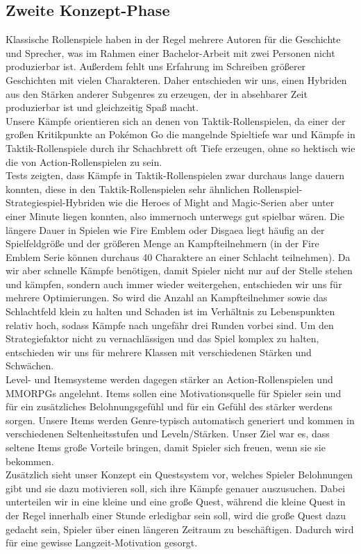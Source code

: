 \documentclass[extern,palatino]{cgBA}
\begin{document}
\subsection{Zweite Konzept-Phase}
Klassische Rollenspiele haben in der Regel mehrere Autoren für die Geschichte und Sprecher, was im Rahmen einer Bachelor-Arbeit mit zwei Personen nicht produzierbar ist. Außerdem fehlt uns Erfahrung im Schreiben größerer Geschichten mit vielen Charakteren. Daher entschieden wir uns, einen Hybriden aus den Stärken anderer Subgenres zu erzeugen, der in absehbarer Zeit produzierbar ist und gleichzeitig Spaß macht. 
\\Unsere Kämpfe orientieren sich an denen von Taktik-Rollenspielen, da einer der großen Kritikpunkte an Pokémon Go die mangelnde Spieltiefe war und Kämpfe in Taktik-Rollenspiele durch ihr Schachbrett oft Tiefe erzeugen, ohne so hektisch wie die von Action-Rollenspielen zu sein. \\Tests zeigten, dass Kämpfe in Taktik-Rollenspielen zwar durchaus lange dauern konnten, diese in den Taktik-Rollenspielen sehr ähnlichen Rollenspiel-Strategiespiel-Hybriden wie die Heroes of Might and Magic-Serien aber unter einer Minute liegen konnten, also immernoch unterwegs gut spielbar wären. Die längere Dauer in Spielen wie Fire Emblem oder Disgaea liegt häufig an der Spielfeldgröße und der größeren Menge an Kampfteilnehmern (in der Fire Emblem Serie können durchaus 40 Charaktere an einer Schlacht teilnehmen). Da wir aber schnelle Kämpfe benötigen, damit Spieler nicht nur auf der Stelle stehen und kämpfen,  sondern auch immer wieder weitergehen, entschieden wir uns für mehrere Optimierungen. So wird die Anzahl an Kampfteilnehmer sowie das Schlachtfeld klein zu halten und Schaden ist im Verhältnis zu Lebenspunkten relativ hoch, sodass Kämpfe nach ungefähr drei Runden vorbei sind. Um den Strategiefaktor nicht zu vernachlässigen und das Spiel komplex zu halten, entschieden wir uns für mehrere Klassen mit verschiedenen Stärken und Schwächen.
\\Level- und Itemsysteme werden dagegen stärker an Action-Rollenspielen und MMORPGs angelehnt. Items sollen eine Motivationsquelle für Spieler sein und für ein zusätzliches Belohnungsgefühl und für ein Gefühl des stärker werdens sorgen. 
Unsere Items werden Genre-typisch automatisch generiert und kommen in verschiedenen Seltenheitsstufen und Leveln/Stärken. Unser Ziel war es, dass seltene Items große Vorteile bringen, damit Spieler sich freuen, wenn sie sie bekommen.
\\Zusätzlich sieht unser Konzept ein Questsystem vor, welches Spieler Belohnungen gibt und sie dazu motivieren soll, sich ihre Kämpfe genauer auszusuchen. Dabei unterteilen wir in eine kleine und eine große Quest, während die kleine Quest in der Regel innerhalb einer Stunde erledigbar sein soll, wird die große Quest dazu gedacht sein, Spieler über einen längeren Zeitraum zu beschäftigen. Dadurch wird für eine gewisse Langzeit-Motivation gesorgt.
\end{document}
